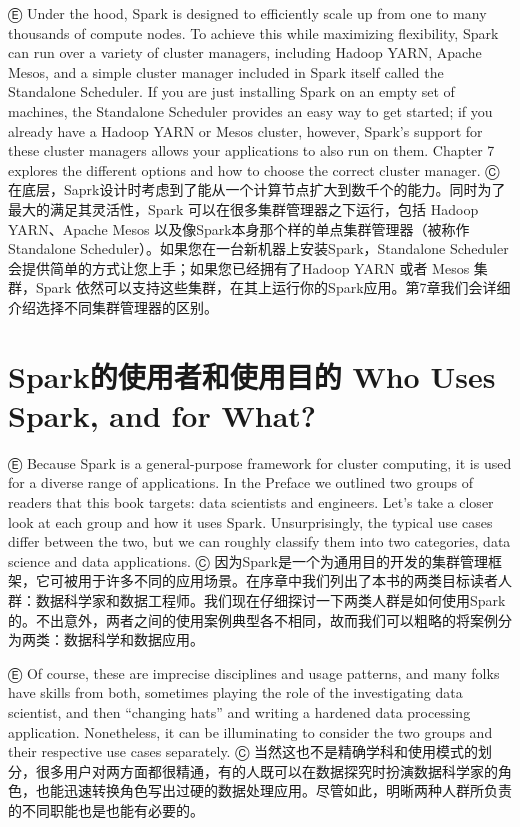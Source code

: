 Ⓔ Under the hood, Spark is designed to efficiently scale up from one to
many thousands of compute nodes. To achieve this while maximizing
flexibility, Spark can run over a variety of cluster managers, including
Hadoop YARN, Apache Mesos, and a simple cluster manager included in
Spark itself called the Standalone Scheduler. If you are just installing
Spark on an empty set of machines, the Standalone Scheduler provides an
easy way to get started; if you already have a Hadoop YARN or Mesos
cluster, however, Spark's support for these cluster managers allows your
applications to also run on them. Chapter 7 explores the different
options and how to choose the correct cluster manager. Ⓒ
在底层，Saprk设计时考虑到了能从一个计算节点扩大到数千个的能力。同时为了最大的满足其灵活性，Spark 可以在很多集群管理器之下运行，包括 Hadoop YARN、Apache Mesos 以及像Spark本身那个样的单点集群管理器（被称作 Standalone Scheduler）。如果您在一台新机器上安装Spark，Standalone Scheduler 会提供简单的方式让您上手；如果您已经拥有了Hadoop YARN 或者 Mesos 集群，Spark 依然可以支持这些集群，在其上运行你的Spark应用。第7章我们会详细介绍选择不同集群管理器的区别。

\section{Spark的使用者和使用目的 Who Uses Spark, and for
What?}\label{sparkux7684ux4f7fux7528ux8005ux548cux4f7fux7528ux76eeux7684-who-uses-spark-and-for-what}

Ⓔ Because Spark is a general-purpose framework for cluster computing, it
is used for a diverse range of applications. In the Preface we outlined
two groups of readers that this book targets: data scientists and
engineers. Let's take a closer look at each group and how it uses Spark.
Unsurprisingly, the typical use cases differ between the two, but we can
roughly classify them into two categories, data science and data
applications. Ⓒ
因为Spark是一个为通用目的开发的集群管理框架，它可被用于许多不同的应用场景。在序章中我们列出了本书的两类目标读者人群：数据科学家和数据工程师。我们现在仔细探讨一下两类人群是如何使用Spark的。不出意外，两者之间的使用案例典型各不相同，故而我们可以粗略的将案例分为两类：数据科学和数据应用。

Ⓔ Of course, these are imprecise disciplines and usage patterns, and
many folks have skills from both, sometimes playing the role of the
investigating data scientist, and then ``changing hats'' and writing a
hardened data processing application. Nonetheless, it can be
illuminating to consider the two groups and their respective use cases
separately. Ⓒ
当然这也不是精确学科和使用模式的划分，很多用户对两方面都很精通，有的人既可以在数据探究时扮演数据科学家的角色，也能迅速转换角色写出过硬的数据处理应用。尽管如此，明晰两种人群所负责的不同职能也是也能有必要的。


